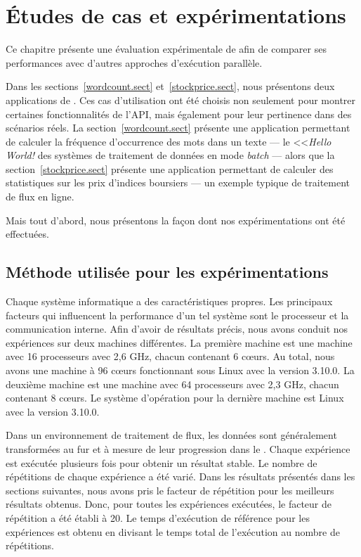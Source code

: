 
\chapter{\'Etudes de cas et exp\'erimentations}
\label{experiences.chap}


Ce chapitre pr\'esente une \'evaluation exp\'erimentale de  afin de comparer ses performances avec d'autres approches d'ex\'ecution parall\`ele.   

Dans les sections~\ref{wordcount.sect} et~\ref{stockprice.sect}, nous pr\'esentons deux applications de . Ces cas d'utilisation ont \'et\'e choisis non seulement pour montrer certaines fonctionnalit\'es de l'API, mais \'egalement pour leur pertinence dans des sc\'enarios r\'eels. La section~\ref{wordcount.sect} pr\'esente une application permettant de calculer la fr\'equence d'occurrence des mots dans un texte --- le <<\emph{Hello World!} des syst\`emes de traitement de donn\'ees en mode \emph{batch} --- alors que la section~\ref{stockprice.sect} pr\'esente une application permettant de calculer des statistiques sur les prix d'indices boursiers --- un exemple typique de traitement de flux en ligne.

Mais tout d'abord, nous pr\'esentons la fa\c{c}on dont nos
exp\'erimentations ont \'et\'e effectu\'ees.

\section{M\'ethode utilis\'ee pour les exp\'erimentations}

Chaque syst\`eme informatique a des caract\'eristiques propres. Les principaux facteurs qui influencent la performance d'un tel syst\`eme sont le processeur et la communication interne. Afin d'avoir de r\'esultats pr\'ecis, nous avons conduit nos exp\'eriences sur deux machines diff\'erentes. La premi\`ere machine est une machine avec 16 processeurs avec 2,6 GHz, chacun contenant 6 cœurs. Au total, nous avons une machine à 96 cœurs fonctionnant sous Linux avec la version 3.10.0. La deuxi\`eme machine est une machine avec 64 processeurs avec 2,3 GHz, chacun contenant 8 cœurs. Le système d'op\'eration pour la derni\`ere machine est Linux avec la version 3.10.0.

Dans un environnement de traitement de flux, les donn\'ees sont g\'en\'eralement transform\'ees au fur et \`a mesure de leur progression dans le . Chaque exp\'erience est ex\'ecut\'ee plusieurs fois pour obtenir un r\'esultat stable. Le nombre de r\'ep\'etitions de chaque exp\'erience a \'et\'e vari\'e. Dans les r\'esultats pr\'esent\'es dans les sections suivantes, nous avons pris le facteur de r\'ep\'etition pour les meilleurs r\'esultats obtenus. Donc, pour toutes les exp\'eriences ex\'ecut\'ees, le facteur de r\'ep\'etition a \'et\'e \'etabli \`a 20. Le temps d'ex\'ecution de r\'ef\'erence pour les exp\'eriences est obtenu en divisant le temps total de l'ex\'ecution au nombre de r\'ep\'etitions.


